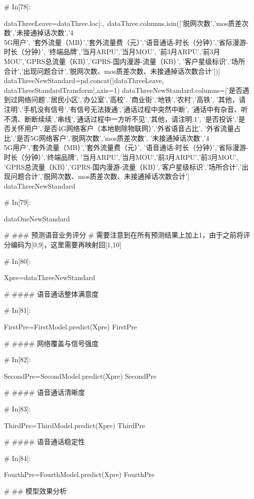 \documentclass{MathorCupmodeling}
\begin{document}
\begin{python}
# In[78]:


dataThreeLeave=dataThree.loc[:,~dataThree.columns.isin(['脱网次数','mos质差次数','未接通掉话次数','4\\5G用户', '套外流量（MB）','套外流量费（元）','语音通话-时长（分钟）','省际漫游-时长（分钟）', '终端品牌','当月ARPU','当月MOU', '前3月ARPU','前3月MOU','GPRS总流量（KB）','GPRS-国内漫游-流量（KB）', '客户星级标识','场所合计','出现问题合计','脱网次数、mos质差次数、未接通掉话次数合计'])]
dataThreeNewStandard=pd.concat([dataThreeLeave, dataThreeStandardTransform],axis=1)
dataThreeNewStandard.columns=['是否遇到过网络问题','居民小区','办公室','高校', '商业街','地铁','农村','高铁', '其他，请注明','手机没有信号','有信号无法拨通','通话过程中突然中断', '通话中有杂音、听不清、断断续续','串线','通话过程中一方听不见','其他，请注明.1', '是否投诉','是否关怀用户','是否4G网络客户（本地剔除物联网）','外省语音占比', '外省流量占比','是否5G网络客户','脱网次数','mos质差次数', '未接通掉话次数','4\\5G用户','套外流量（MB）','套外流量费（元）', '语音通话-时长（分钟）','省际漫游-时长（分钟）','终端品牌', '当月ARPU','当月MOU','前3月ARPU','前3月MOU', 'GPRS总流量（KB）','GPRS-国内漫游-流量（KB）','客户星级标识','场所合计','出现问题合计','脱网次数、mos质差次数、未接通掉话次数合计']
dataThreeNewStandard


# In[79]:


dataOneNewStandard


# ### 预测语音业务评分
# 需要注意到在所有预测结果上加上1，由于之前将评分编码为[0,9]，这里需要再映射回[1,10]

# In[80]:


Xpre=dataThreeNewStandard


# #### 语音通话整体满意度

# In[81]:


FirstPre=FirstModel.predict(Xpre)
FirstPre


# #### 网络覆盖与信号强度

# In[82]:


SecondPre=SecondModel.predict(Xpre)
SecondPre


# #### 语音通话清晰度

# In[83]:


ThirdPre=ThirdModel.predict(Xpre)
ThirdPre


# #### 语音通话稳定性

# In[84]:


FourthPre=FourthModel.predict(Xpre)
FourthPre


# ## 模型效果分析


\end{python}
\end{document}
